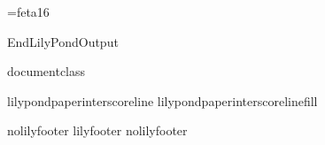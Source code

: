 
\def\ifundefined#1{\expandafter\ifx\csname#1\endcsname\relax}



\font\fetasixteen=feta16
\def\fetafont{\fetasixteen}
\def\fetachar#1{\hbox{\fetasixteen#1}}

\ifx\mustmakelilypondtitle\undefined\else\makelilypondtitle\fi
\ifx\mustmakelilypondpiecetitle\undefined\else\makelilypondpiecetitle\fi
%
\def\SkipLilydefs{\endinput}
\ifundefined{EndLilyPondOutput}
        \def\EndLilyPondOutput{\csname bye\endcsname}
        \def\SkipLilydefs{}
\fi
\SkipLilydefs

\ifundefined{documentclass}
        
\else
        
\fi

\def\botalign#1{\vbox to 0pt{\vss #1}}
\def\leftalign#1{\hbox to 0pt{#1\hss}}

\def\myfilbreak{\par\vfil\penalty200\vfilneg}

\ifundefined{lilypondpaperinterscoreline}
        \def\lilypondpaperinterscoreline{16}
\fi
\ifundefined{lilypondpaperinterscorelinefill}
        \def\lilypondpaperinterscorelinefill{0}
\fi

\def\interscoreline{\vskip\lilypondpaperinterscoreline pt plus %
  \lilypondpaperinterscorelinefill fill}

\def\placebox#1#2#3{%
        \botalign{\hbox{\raise #1\leftalign{\kern #2{}#3}}}}%

\ifx\pdfoutput\undefined  
  
\else
  
\fi

\def\EndLilyPondOutput{%
 \vskip 0pt plus \lilypondpaperinterscorelinefill00 fill\csname bye\endcsname
}
\def\postheader{}


\ifx\csname nolilyfooter\endcsname\relax
        \csname lilyfooter\texsuffix\endcsname%
\else
        \csname%
        nolilyfooter\texsuffix\endcsname
\fi
\newdimen\outputscale
\endinput

